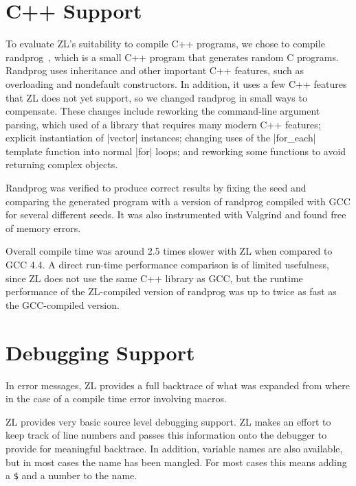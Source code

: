 \section{C++ Support}
\label{c++-support}

To evaluate ZL's suitability to compile C++ programs, we chose to
compile randprog~\cite{randprog}, which is a small C++ program that
generates random C programs.  Randprog uses inheritance and other
important C++ features, such as overloading and nondefault
constructors.  In addition, it uses a few C++ features that ZL does not
yet support, so we changed randprog in small ways to compensate.  These
changes include reworking the command-line argument parsing, which
used of a library that requires many modern C++ features; explicit
instantiation of |vector| instances; changing uses of the |for_each|
template function into normal |for| loops; and reworking some functions
to avoid returning complex objects.

Randprog was verified to produce correct results by fixing the seed
and comparing the generated program with a version of randprog
compiled with GCC for several different seeds.  It was also
instrumented with Valgrind and found free of memory errors.

Overall compile time was around 2.5 times slower with ZL when compared to
GCC 4.4.  A direct run-time performance comparison is of limited
usefulness, since ZL does not use the same C++ library as GCC, but the
runtime performance of the ZL-compiled version of randprog was up to
twice as fast as the GCC-compiled version.

\section{Debugging Support}
\label{debugging-support}

In error messages, ZL provides a full backtrace of what was expanded
from where in the case of a compile time error involving macros.

ZL provides very basic source level debugging support.  ZL makes an
effort to keep track of line numbers and passes this information onto
the debugger to provide for meaningful backtrace.  
In addition, variable names are also available, but in most cases the
name has been mangled.  For most cases this means 
adding a \verb/$/ and a number to the name.
